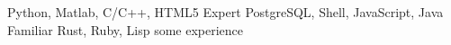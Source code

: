 \begin{cvhonors}
  \cvhonor
    {Python, Matlab, C/C++, HTML5}
    {Expert}
    {}
    {}
  \cvhonor
    {PostgreSQL, Shell, JavaScript, Java}
    {Familiar}
    {}
    {}
  \cvhonor
    {Rust, Ruby, Lisp}
    {some experience}
    {}
    {}
\end{cvhonors}
